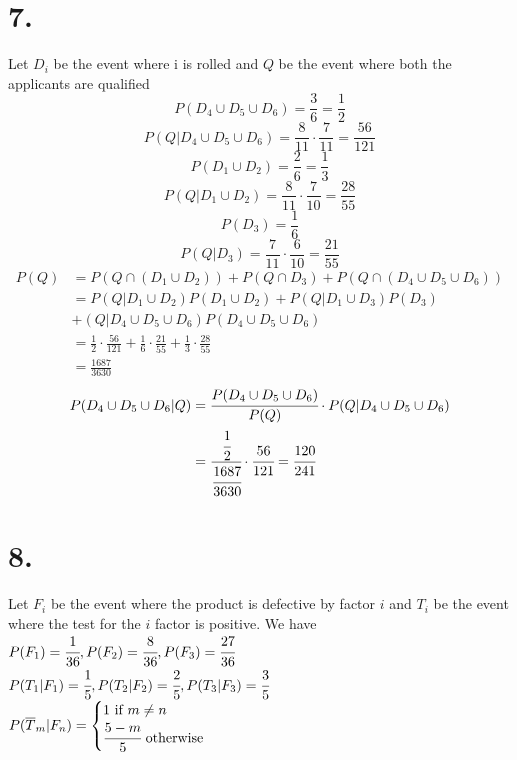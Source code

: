 \documentclass[11pt]{article}
\begin{document}
\section*{7.}
Let $D_i$ be the event where i is rolled and $Q$ be the event where both the applicants are qualified
\[
P(D_4 \cup D_5 \cup D_6) = \frac{3}{6} = \frac{1}{2} 
\]
\[
P(Q | D_4 \cup D_5 \cup D_6) = \frac{8}{11} \cdot \frac{7}{11} = \frac{56}{121}
\]
\[
P(D_1 \cup D_2) = \frac{2}{6} = \frac{1}{3}
\]
\[
P(Q | D_1 \cup D_2) = \frac{8}{11} \cdot \frac{7}{10} = \frac{28}{55}
\]
\[
P(D_3) = \frac{1}{6}
\]
\[
P(Q | D_3) = \frac{7}{11} \cdot \frac{6}{10} = \frac{21}{55}
\]
\begin{equation*}
\begin{aligned}
P(Q) &= P(Q \cap (D_1 \cup D_2)) + P(Q \cap D_3) + P(Q \cap (D_4 \cup D_5 \cup D_6)) \\
& = P(Q | D_1 \cup D_2)P(D_1 \cup D_2) + P(Q | D_1 \cup D_3)P(D_3) \\
&+ (Q | D_4 \cup D_5 \cup D_6)P(D_4 \cup D_5 \cup D_6) \\ 
&= \frac{1}{2} \cdot \frac{56}{121} + \frac{1}{6} \cdot \frac{21}{55} + \frac{1}{3} \cdot \frac{28}{55} \\
&= \frac{1687}{3630}
\end{aligned}
\end{equation*}
\begin{equation*}
\begin{aligned}
P(D_4 \cup D_5 \cup D_6 | Q) &= \cfrac{P(D_4 \cup D_5 \cup D_6)}{P(Q)} \cdot P(Q | D_4 \cup D_5 \cup D_6) \\
&= \cfrac{\cfrac{1}{2}}{\cfrac{1687}{3630}} \cdot \cfrac{56}{121} = \cfrac{120}{241}
\end{aligned}
\end{equation*}
\pagebreak
\section*{8.}
Let $F_i$ be the event where the product is defective by factor $i$ and $T_i$ be the event where the test for the $i$ factor is positive.
We have \\ 
$P(F_1) = \cfrac{1}{36}, P(F_2) = \cfrac{8}{36}, P(F_3) = \cfrac{27}{36}$ \\
$P(T_1|F_1) = \cfrac{1}{5}, P(T_2|F_2) = \cfrac{2}{5}, P(T_3|F_3) = \cfrac{3}{5} $\\
$P(\overline{T}_m | F_n) = 
\begin{cases}
1 \text{ if } m\ne n \\
\cfrac{5-m}{5} \text{ otherwise}
\end{cases} 
$
\end{document}
